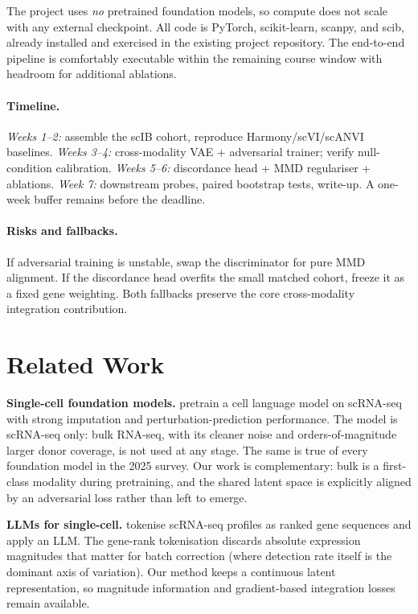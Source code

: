 \documentclass[11pt]{article}
\begin{document}
The project uses \emph{no} pretrained foundation models, so compute does not
scale with any external checkpoint. All code is PyTorch, scikit-learn,
scanpy, and scib, already installed and exercised in the existing project
repository. The end-to-end pipeline is comfortably executable within the
remaining course window with headroom for additional ablations.

\paragraph{Timeline.}
\emph{Weeks 1--2:} assemble the scIB cohort, reproduce Harmony/scVI/scANVI
baselines. \emph{Weeks 3--4:} cross-modality VAE + adversarial trainer;
verify null-condition calibration. \emph{Weeks 5--6:} discordance head + MMD
regulariser + ablations. \emph{Week 7:} downstream probes, paired bootstrap
tests, write-up. A one-week buffer remains before the deadline.

\paragraph{Risks and fallbacks.}
If adversarial training is unstable, swap the discriminator for pure MMD
alignment. If the discordance head overfits the small matched cohort, freeze
it as a fixed gene weighting. Both fallbacks preserve the core cross-modality
integration contribution.

\section{Related Work}

\textbf{Single-cell foundation models.}
\citet{wen-etal-2024-cellplm} pretrain a cell language model on scRNA-seq
with strong imputation and perturbation-prediction performance. The model is
scRNA-seq only: bulk RNA-seq, with its cleaner noise and orders-of-magnitude
larger donor coverage, is not used at any stage. The same is true of every
foundation model in the 2025 survey. Our work is complementary: bulk is a
first-class modality during pretraining, and the shared latent space is
explicitly aligned by an adversarial loss rather than left to emerge.

\textbf{LLMs for single-cell.}
\citet{levine-etal-2024-cell2sentence} tokenise scRNA-seq profiles as ranked
gene sequences and apply an LLM. The gene-rank tokenisation discards absolute
expression magnitudes that matter for batch correction (where detection rate
itself is the dominant axis of variation). Our method keeps a continuous
latent representation, so magnitude information and gradient-based integration
losses remain available.
\end{document}
